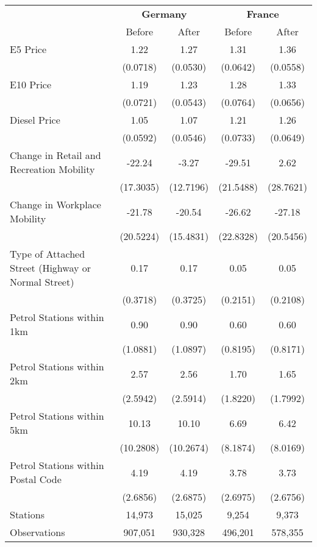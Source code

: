 \begin{tabular}{l*{4}{c}}
\toprule
                    &\multicolumn{2}{c}{\textbf{Germany}}&\multicolumn{2}{c}{\textbf{France}}\\\cmidrule(lr){2-3}\cmidrule(lr){4-5}
                    &\multicolumn{1}{c}{Before}&\multicolumn{1}{c}{After}&\multicolumn{1}{c}{Before}&\multicolumn{1}{c}{After}\\
\midrule
E5 Price            &        1.22&        1.27&        1.31&        1.36\\
                    &    (0.0718)&    (0.0530)&    (0.0642)&    (0.0558)\\
E10 Price           &        1.19&        1.23&        1.28&        1.33\\
                    &    (0.0721)&    (0.0543)&    (0.0764)&    (0.0656)\\
Diesel Price        &        1.05&        1.07&        1.21&        1.26\\
                    &    (0.0592)&    (0.0546)&    (0.0733)&    (0.0649)\\
Change in Retail and Recreation Mobility&      -22.24&       -3.27&      -29.51&        2.62\\
                    &   (17.3035)&   (12.7196)&   (21.5488)&   (28.7621)\\
Change in Workplace Mobility&      -21.78&      -20.54&      -26.62&      -27.18\\
                    &   (20.5224)&   (15.4831)&   (22.8328)&   (20.5456)\\
Type of Attached Street (Highway or Normal Street)&        0.17&        0.17&        0.05&        0.05\\
                    &    (0.3718)&    (0.3725)&    (0.2151)&    (0.2108)\\
Petrol Stations within 1km&        0.90&        0.90&        0.60&        0.60\\
                    &    (1.0881)&    (1.0897)&    (0.8195)&    (0.8171)\\
Petrol Stations within 2km&        2.57&        2.56&        1.70&        1.65\\
                    &    (2.5942)&    (2.5914)&    (1.8220)&    (1.7992)\\
Petrol Stations within 5km&       10.13&       10.10&        6.69&        6.42\\
                    &   (10.2808)&   (10.2674)&    (8.1874)&    (8.0169)\\
Petrol Stations within Postal Code&        4.19&        4.19&        3.78&        3.73\\
                    &    (2.6856)&    (2.6875)&    (2.6975)&    (2.6756)\\
\midrule
Stations            &      14,973&      15,025&       9,254&       9,373\\
Observations        &     907,051&     930,328&     496,201&     578,355\\
\bottomrule
\end{tabular}
